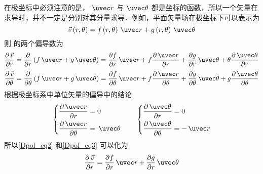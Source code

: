 

在极坐标中必须注意的是， $\uvec r$ 与 $\uvec \theta $ 都是坐标的函数，所以一个矢量在求导时，并不一定是分别对其分量求导．例如，平面矢量场在极坐标下可以表示为
\begin{equation}\label{Dpol_eq1}
\vec v\left( {r,\theta } \right) = f\left( {r,\theta } \right)\,\uvec r + g\left( {r,\theta } \right)\,\uvec \theta 
\end{equation}
则 的两个偏导数为
\begin{equation}\label{Dpol_eq2}
\frac{{\partial \,\vec v}}{{\partial r}} = \frac{\partial }{{\partial r}}\left( {f\,\uvec r + g\,\uvec \theta } \right) = \frac{{\partial f}}{{\partial r}}\,\uvec r + f\frac{{\partial \,\uvec r}}{{\partial r}} + \frac{{\partial g}}{{\partial r}}\,\uvec \theta  + \theta \frac{{\partial \,\uvec \theta }}{{\partial r}}
\end{equation}
\begin{equation}\label{Dpol_eq3}
\frac{{\partial \,\vec v}}{{\partial \theta }} = \frac{\partial }{{\partial \theta }}\left( {f\,\uvec r + g\,\uvec \theta } \right) = \frac{{\partial f}}{{\partial \theta }}\,\uvec r + f\frac{{\partial \,\uvec r}}{{\partial \theta }} + \frac{{\partial g}}{{\partial \theta }}\,\uvec \theta  + g\frac{{\partial \,\uvec \theta }}{{\partial \theta }}
\end{equation}
根据极坐标系中单位矢量的偏导中的结论
\begin{equation}
\left\{ \begin{aligned}
\frac{{\partial \,\uvec r}}{{\partial r}} &= 0\\
\frac{{\partial \,\uvec r}}{{\partial \theta }} &= \,\uvec \theta 
\end{aligned} \right.
\qquad
\left\{ \begin{aligned}
\frac{{\partial \,\uvec \theta }}{{\partial r}} &= 0\\
\frac{{\partial \,\uvec \theta }}{{\partial \theta }} &=  - \,\uvec r
\end{aligned} \right.
\end{equation}
所以\autoref{Dpol_eq2} 和\autoref{Dpol_eq3} 可以化为
\begin{equation}
\frac{{\partial \,\vec v}}{{\partial r}} = \frac{{\partial f}}{{\partial r}}\,\uvec r + \frac{{\partial g}}{{\partial r}}\,\uvec \theta 
\end{equation}

